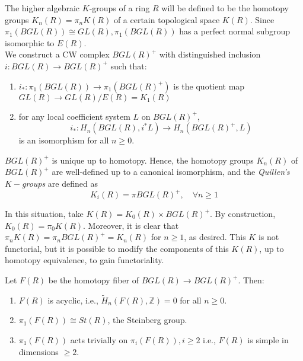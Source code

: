 The higher algebraic $K$-groups of a ring $R$ will be defined to be the homotopy groups $K_n(R)=\pi_n K(R)$ of a certain topological space $K(R)$.
Since $\pi_1(B G L(R)) \cong G L(R), \pi_1(B G L(R))$ has a perfect normal subgroup isomorphic to $E(R)$.\\

We construct a CW complex $B G L(R)^{+}$ with distinguished inclusion $ i: B G L(R) \rightarrow B G L(R)^{+}$ such that:
\begin{enumerate}
    \item $i_*: \pi_1(B G L(R)) \longrightarrow \pi_1\left(B G L(R)^{+}\right)$ is the quotient map $G L(R) \longrightarrow G L(R) / E(R) = K_1(R)$
    \item for any local coefficient system $L$ on $B G L(R)^{+}$,
$$
i_*: H_n\left(B G L(R), i^* L\right) \longrightarrow H_n\left(B G L(R)^{+}, L\right)
$$
is an isomorphism for all $n \geq 0$.
\end{enumerate}

$B G L(R)^{+}$ is unique up to homotopy. Hence, the homotopy groups $K_n(R)$ of $B G L(R)^{+}$ are well-defined up to a canonical isomorphism, and the \textit{Quillen's $K-$groups} are defined as $$K_i (R) = \pi BGL(R)^+, \quad \forall n\geq 1 $$ 

In this situation, take $K(R) = K_0(R) \times B G L(R)^{+}$. By construction, $K_0(R)=\pi_0 K(R)$. Moreover, it is clear that $\pi_n K(R)=\pi_n B G L(R)^{+}=K_n(R)$ for $n \geq 1$, as desired. 
This $K$ is not functorial, but it is possible to modify the components of this $K(R)$, up to homotopy equivalence, to gain functoriality.


\begin{prop}
    Let $F(R)$ be the homotopy fiber of $B G L(R) \longrightarrow B G L(R)^{+}$. Then:
    \begin{enumerate}
        \item $F(R)$ is acyclic, i.e., $\tilde{H}_n(F(R), \mathbb{Z})=0$ for all $n \geq 0$.
        \item $\pi_1(F(R)) \cong S t(R)$, the Steinberg group.
        \item $\pi_1(F(R))$ acts trivially on $\pi_i(F(R)), i \geq 2$ i.e., $F(R)$ is simple in dimensions $\geq 2$.   
    \end{enumerate} 
\end{prop}


